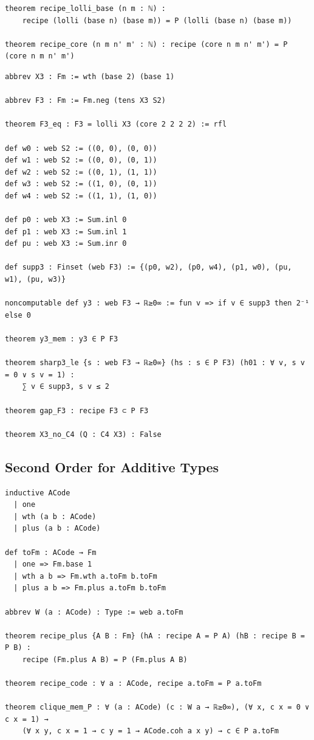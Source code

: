 \label{lean:recipe-core}
\begin{lstlisting}
theorem recipe_lolli_base (n m : ℕ) :
    recipe (lolli (base n) (base m)) = P (lolli (base n) (base m))

theorem recipe_core (n m n' m' : ℕ) : recipe (core n m n' m') = P (core n m n' m')
\end{lstlisting}

\label{lean:gap-f3}
\begin{lstlisting}
abbrev X3 : Fm := wth (base 2) (base 1)

abbrev F3 : Fm := Fm.neg (tens X3 S2)

theorem F3_eq : F3 = lolli X3 (core 2 2 2 2) := rfl

def w0 : web S2 := ((0, 0), (0, 0))
def w1 : web S2 := ((0, 0), (0, 1))
def w2 : web S2 := ((0, 1), (1, 1))
def w3 : web S2 := ((1, 0), (0, 1))
def w4 : web S2 := ((1, 1), (1, 0))

def p0 : web X3 := Sum.inl 0
def p1 : web X3 := Sum.inl 1
def pu : web X3 := Sum.inr 0

def supp3 : Finset (web F3) := {(p0, w2), (p0, w4), (p1, w0), (pu, w1), (pu, w3)}

noncomputable def y3 : web F3 → ℝ≥0∞ := fun v => if v ∈ supp3 then 2⁻¹ else 0

theorem y3_mem : y3 ∈ P F3

theorem sharp3_le {s : web F3 → ℝ≥0∞} (hs : s ∈ P F3) (h01 : ∀ v, s v = 0 ∨ s v = 1) :
    ∑ v ∈ supp3, s v ≤ 2

theorem gap_F3 : recipe F3 ⊂ P F3

theorem X3_no_C4 (Q : C4 X3) : False
\end{lstlisting}

\subsection{Second Order for Additive Types}

\label{lean:recipe-code}
\begin{lstlisting}
inductive ACode
  | one
  | wth (a b : ACode)
  | plus (a b : ACode)

def toFm : ACode → Fm
  | one => Fm.base 1
  | wth a b => Fm.wth a.toFm b.toFm
  | plus a b => Fm.plus a.toFm b.toFm

abbrev W (a : ACode) : Type := web a.toFm

theorem recipe_plus {A B : Fm} (hA : recipe A = P A) (hB : recipe B = P B) :
    recipe (Fm.plus A B) = P (Fm.plus A B)

theorem recipe_code : ∀ a : ACode, recipe a.toFm = P a.toFm

theorem clique_mem_P : ∀ (a : ACode) (c : W a → ℝ≥0∞), (∀ x, c x = 0 ∨ c x = 1) →
    (∀ x y, c x = 1 → c y = 1 → ACode.coh a x y) → c ∈ P a.toFm
\end{lstlisting}

